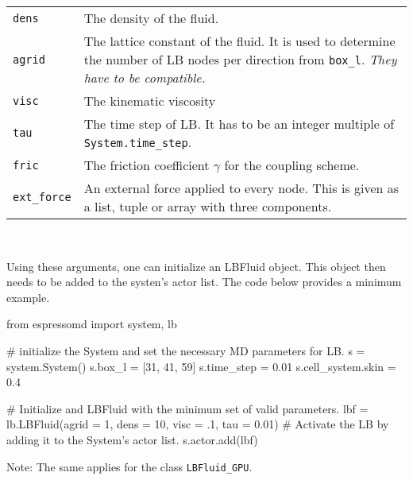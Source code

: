 \vspace{0,2cm}
\begin{tabular}{p{}p{}}
\texttt{dens} & The density of the fluid.\\
\texttt{agrid} & The lattice constant of the fluid. It is used to determine the number of LB nodes 
per direction from \texttt{box\_l}. {\em They have to be compatible.} \\
\texttt{visc} & The kinematic viscosity \\
  \texttt{tau} & The time step of LB. It has to be an integer multiple of
  \texttt{System.time\_step}. \\
\texttt{fric} & The friction coefficient $\gamma$ for the coupling scheme. \\
\texttt{ext\_force} & An external force applied to every node. This is given as
a list, tuple or array with three components.%
\end{tabular}\\ 
\vspace{0,2cm}

Using these arguments, one can initialize an LBFluid object. This object then
needs to be added to the systen's actor list. The code below provides a minimum
example.
\vspace{0,2cm}
\begin{pypresso}
  from espressomd import system, lb

  # initialize the System and set the necessary MD parameters for LB.
  s = system.System()
  s.box\_l = [31, 41, 59]
  s.time\_step = 0.01
  s.cell\_system.skin = 0.4

  # Initialize and LBFluid with the minimum set of valid parameters.
  lbf = lb.LBFluid(agrid = 1, dens = 10, visc = .1, tau = 0.01)
  # Activate the LB by adding it to the System's actor list.
  s.actor.add(lbf)
\end{pypresso}
\vspace{0,2cm}
Note: The same applies for the class \texttt{LBFluid\_GPU}.

